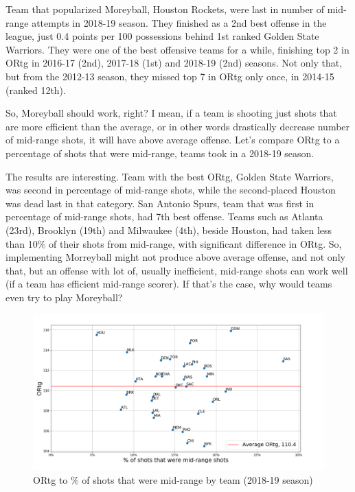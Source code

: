 \documentclass[a4paper]{article}
\begin{document}
Team that popularized Moreyball, Houston Rockets, were last in number of mid-range attempts in 2018-19 season. They finished as a 2nd best offense in the league, just 0.4 points per 100 possessions behind 1st ranked Golden State Warriors. They were one of the best offensive teams for a while, finishing top 2 in ORtg in 2016-17 (2nd), 2017-18 (1st) and 2018-19 (2nd) seasons. Not only that, but from the 2012-13 season, they missed top 7 in ORtg only once, in 2014-15 (ranked 12th).

So, Moreyball should work, right? I mean, if a team is shooting just shots that are more efficient than the average, or in other words drastically decrease number of mid-range shots, it will have above average offense. Let's compare ORtg to a percentage of shots that were mid-range, teams took in a 2018-19 season.

The results are interesting. Team with the best ORtg, Golden State Warriors, was second in percentage of mid-range shots, while the second-placed Houston was dead last in that category. San Antonio Spurs, team that was first in percentage of mid-range shots, had 7th best offense. Teams such as Atlanta (23rd), Brooklyn (19th) and Milwaukee (4th), beside Houston, had taken less than 10\% of their shots from mid-range, with significant difference in ORtg. So, implementing Morreyball might not produce above average offense, and not only that, but an offense with lot of, usually inefficient, mid-range shots can work well (if a team has efficient mid-range scorer). If that's the case, why would teams even try to play Moreyball?

\begin{figure}[h!]
\begin{center}
\includegraphics[scale=0.29]{ortg_pct_mid_range.png}
\end{center}
\caption{ORtg to \% of shots that were mid-range by team (2018-19 season)}
\label{plt:ast_tov_pct_3p}
\end{figure}
\end{document}
